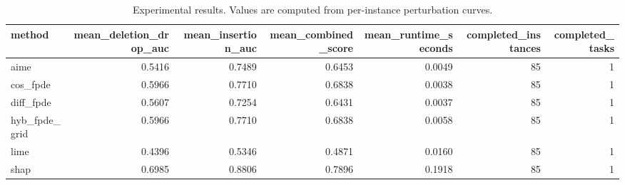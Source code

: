 \begin{table}[t]
\caption{Experimental results. Values are computed from per-instance perturbation curves.}
\label{tab:main_results_computed}
\centering
\begin{tabular}{lrrrrrr}
\toprule
method & mean\_deletion\_drop\_auc & mean\_insertion\_auc & mean\_combined\_score & mean\_runtime\_seconds & completed\_instances & completed\_tasks \\
\midrule
aime & 0.5416 & 0.7489 & 0.6453 & 0.0049 & 85 & 1 \\
cos\_fpde & 0.5966 & 0.7710 & 0.6838 & 0.0038 & 85 & 1 \\
diff\_fpde & 0.5607 & 0.7254 & 0.6431 & 0.0037 & 85 & 1 \\
hyb\_fpde\_grid & 0.5966 & 0.7710 & 0.6838 & 0.0058 & 85 & 1 \\
lime & 0.4396 & 0.5346 & 0.4871 & 0.0160 & 85 & 1 \\
shap & 0.6985 & 0.8806 & 0.7896 & 0.1918 & 85 & 1 \\
\bottomrule
\end{tabular}

\end{table}
